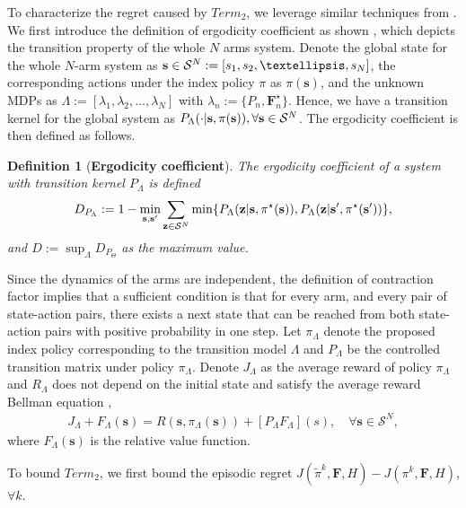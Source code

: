\documentclass{article} %
\newcommand{\bF}{\mathbf{F}}
\newcommand{\bs}{\mathbf{s}}
\newcommand{\cS}{\mathcal{S}}
\newtheorem{definition}{Definition}
\begin{document}
{To characterize the regret caused by $Term_2$, we leverage similar techniques from \cite{xiong2022Nips}. We first introduce the definition of ergodicity coefficient as shown \cite{arapostathis1993discrete,akbarzadeh2022learning}, which depicts the transition property of the whole $N$ arms system. 
Denote the global state for the whole $N$-arm system as $\bold{s}\in\cS^N:=[s_1, s_2,\ldots, s_N]$, the corresponding actions under the index policy $\pi$ as $\pi(\bs)$, and the unknown MDPs as ${\Lambda}:=[\lambda_1, \lambda_2, \ldots, \lambda_N]$ with  $\lambda_n:=\{P_n, \bF_n^\star\}$. Hence, we have a transition kernel for the global system as $P_\Lambda(\cdot|\bs, \pi(\bold{s})), \forall \bold{s}\in\cS^N$. The ergodicity coefficient is then defined as follows. 
\begin{definition}[\textbf{Ergodicity coefficient}]
The ergodicity coefficient of a system with transition kernel $P_{{\Lambda}}$ is defined
\begin{align}
    D_{P_{{\Lambda}}}:=1-\min_{\bold{s}, \bold{s}^\prime} \sum_{\bold{z}\in\cS^N}\min\{P_{{\Lambda}}(\bold{z}|\bold{s},\pi^\star(\bold{s})),P_{{\Lambda}}(\bold{z}|\bold{s}^\prime,\pi^\star(\bold{s}^\prime)) \} , 
\end{align}
and $D:=\sup_{{\Lambda}}D_{P_{{\Theta}}}$ as the maximum value.
\end{definition}
Since the dynamics of the arms are independent, the
definition of contraction factor implies that a sufficient condition is that for every arm, and every pair
of state-action pairs, there exists a next state that can be reached from both state-action pairs with
positive probability in one step. Let $\pi_{{\Lambda}}$ denote the proposed   index policy corresponding to the transition model ${\Lambda}$ and $P_\Lambda$ be the controlled transition matrix under policy $\pi_{{\Lambda}}$. Denote $J_{{\Lambda}}$ as the average reward of policy $\pi_{{\Lambda}}$ and $R_{{\Lambda}}$ does not depend on the initial state and satisfy the average reward Bellman equation \citep{altman1999constrained, puterman1994markov},
\begin{align}\label{eq:bellman}
    J_{{\Lambda}}+F_{{\Lambda}}(\bs)=R(\bs, \pi_{{\Lambda}}(\bs))+[P_{{\Lambda}} F_{{\Lambda}}](s), \quad\forall \bs\in\cS^N,
\end{align}
where  $F_{\Lambda}(\bs)$ is the relative value function.
 
To bound $Term_2$, we first bound the episodic regret $J( \tilde{\pi}^k, \bF, H)-J(\pi^{k}, \bF, H)$, $\forall k$. 

}
\end{document}
